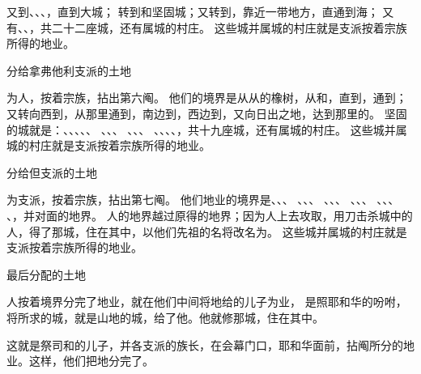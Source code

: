 {又到{}、{}、{}、{}，直到{}大城；
转到{}和坚固城{}；又转到{}，靠近{}一带地方，直通到海；
又有{}、{}、{}，共二十二座城，还有属城的村庄。
这些城并属城的村庄就是{}支派按着宗族所得的地业。
\par }{\SH 分给拿弗他利支派的土地
\par }{\PP {}为{}人，按着宗族，拈出第六阄。
他们的境界是从{}从{}的橡树，从{}和{}，直到{}，通到{}；
又转向西到{}，从那里通到{}，南边到{}，西边到{}，又向日出之地，达到{}那里的{}。
坚固的城就是：{}、{}、{}、{}、{}、
、{}、{}、
、{}、{}、
、{}、{}、{}、{}，共十九座城，还有属城的村庄。
这些城并属城的村庄就是{}支派按着宗族所得的地业。
\par }{\SH 分给但支派的土地
\par }{\PP {}为{}支派，按着宗族，拈出第七阄。
他们地业的境界是{}、{}、{}、
、{}、{}、
、{}、{}、
、{}、{}、
、{}、{}、
、{}，并{}对面的地界。
人的地界越过原得的地界；因为{}人上去攻取{}，用刀击杀城中的人，得了那城，住在其中，以他们先祖{}的名将{}改名为{}。
这些城并属城的村庄就是{}支派按着宗族所得的地业。
\par }{\SH 最后分配的土地
\par }{\PP {}人按着境界分完了地业，就在他们中间将地给{}的儿子{}为业，
是照耶和华的吩咐，将{}所求的城，就是{}山地的{}城，给了他。他就修那城，住在其中。
\par }{\PP {}这就是祭司{}和{}的儿子{}，并{}各支派的族长，在{}会幕门口，耶和华面前，拈阄所分的地业。这样，他们把地分完了。

}
